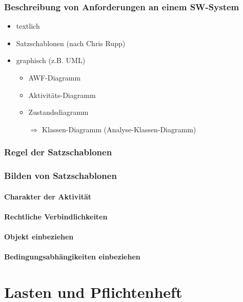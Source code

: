 \subsection{Beschreibung von Anforderungen an einem SW-System}
\begin{itemize}
\item textlich
\item Satzschablonen (nach Chris Rupp)
\item graphisch (z.B. UML)
\begin{itemize}
\item AWF-Diagramm
\item Aktivitäts-Diagramm
\item Zustandsdiagramm
\item[$\Rightarrow$] Klassen-Diagramm (Analyse-Klassen-Diagramm)
\end{itemize}
\end{itemize}

\subsection{Regel der Satzschablonen}

\subsection{Bilden von Satzschablonen}

\subsubsection{Charakter der Aktivität}

\subsubsection{Rechtliche Verbindlichkeiten}

\subsubsection{Objekt einbeziehen}

\subsubsection{Bedingungsabhängikeiten einbeziehen}


\chapter{Lasten und Pflichtenheft}

